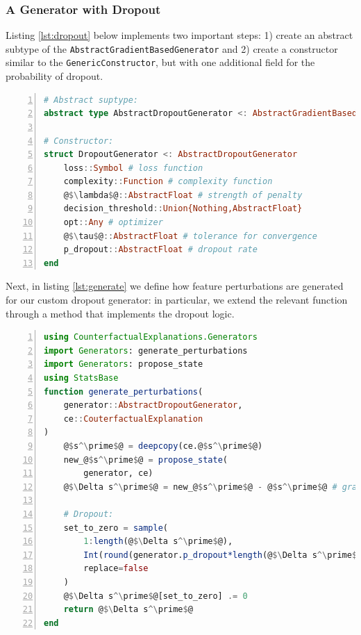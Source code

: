 \documentclass{juliacon}
\begin{document}
\hypertarget{a-generator-with-dropout}{%
\subsubsection{A Generator with
Dropout}\label{a-generator-with-dropout}}

Listing \ref{lst:dropout} below implements two important steps: 1)
create an abstract subtype of the
\texttt{AbstractGradientBasedGenerator} and 2) create a constructor
similar to the \texttt{GenericConstructor}, but with one additional
field for the probability of dropout.

\begin{lstlisting}[language=Julia, escapechar=@, numbers=left, label={lst:dropout}, caption={}]
# Abstract suptype:
abstract type AbstractDropoutGenerator <: AbstractGradientBasedGenerator end

# Constructor:
struct DropoutGenerator <: AbstractDropoutGenerator
    loss::Symbol # loss function
    complexity::Function # complexity function
    @$\lambda$@::AbstractFloat # strength of penalty
    decision_threshold::Union{Nothing,AbstractFloat} 
    opt::Any # optimizer
    @$\tau$@::AbstractFloat # tolerance for convergence
    p_dropout::AbstractFloat # dropout rate
end
\end{lstlisting}

Next, in listing \ref{lst:generate} we define how feature perturbations
are generated for our custom dropout generator: in particular, we extend
the relevant function through a method that implements the dropout
logic.

\begin{lstlisting}[language=Julia, escapechar=@, numbers=left, label={lst:generate}, caption={}]
using CounterfactualExplanations.Generators
import Generators: generate_perturbations
import Generators: propose_state
using StatsBase
function generate_perturbations(
    generator::AbstractDropoutGenerator, 
    ce::CouterfactualExplanation
)
    @$s^\prime$@ = deepcopy(ce.@$s^\prime$@)
    new_@$s^\prime$@ = propose_state(
        generator, ce)
    @$\Delta s^\prime$@ = new_@$s^\prime$@ - @$s^\prime$@ # gradient step

    # Dropout:
    set_to_zero = sample(
        1:length(@$\Delta s^\prime$@),
        Int(round(generator.p_dropout*length(@$\Delta s^\prime$@))),
        replace=false
    )
    @$\Delta s^\prime$@[set_to_zero] .= 0
    return @$\Delta s^\prime$@
end
\end{lstlisting}
\end{document}
